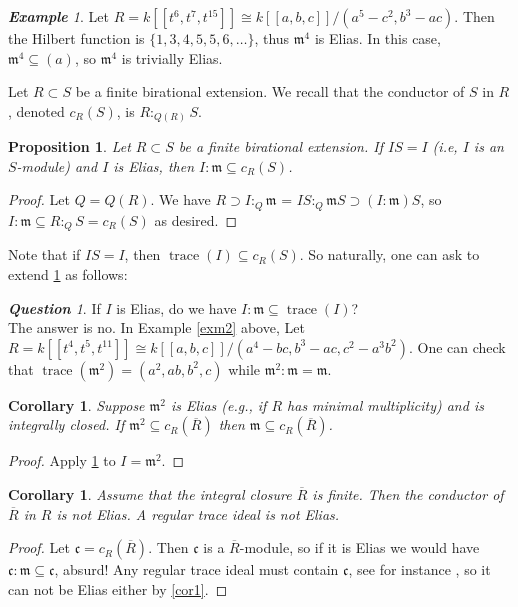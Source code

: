 \documentclass[a4paper,12pt]{amsart}
\newtheorem{prop}[thm]{\bf Proposition}
\newtheorem{cor}[thm]{\bf Corollary}
\theoremstyle{definition}
\theoremstyle{remark}
\newtheorem{question}[thm]{\bf Question}
\newtheorem{example}[thm]{\bf Example}
\numberwithin{equation}{section}
\DeclareMathOperator{\tr}{{trace}}
\def\fm{\mathfrak{m}}
\begin{document}
\begin{example}
Let $R=k[[t^6,t^7,t^{15}]]\cong k[[a,b,c]]/(a^5-c^2, b^3-ac)$. Then the Hilbert function is $\{1,3,4,5,5,6,\dots\}$, thus $\fm^4$ is Elias. In this case, $\fm^4 \subseteq (a)$, so $\fm^4$ is trivially Elias.   \end{example}

Let $R\subset S$ be a finite birational extension. We recall that the conductor of $S$ in $R$, denoted $c_R(S)$, is $R:_{Q(R)}S$. 

\begin{prop}\label{prop_bir}
Let $R\subset S$ be a finite birational extension. If $IS=I$ (i.e, $I$ is an $S$-module) and $I$ is Elias, then $I:\fm\subseteq c_R(S)$. 
\end{prop}



\begin{proof}
Let $Q=Q(R)$. We have $R\supset I:_Q\fm$ = $IS:_Q \fm S \supset (I:\fm)S$, so $I:\fm\subseteq R:_QS =c_R(S)$ as desired.  
\end{proof}



Note that if $IS=I$, then $\tr(I)\subseteq c_R(S)$. So naturally, one can ask to extend \ref{prop_bir} as follows:

\begin{question}
If $I$ is Elias, do we have $I:\fm\subseteq \tr(I)$?\\

The answer is no. In Example \ref{exm2} above, Let $R=k[[t^4,t^5,t^{11}]]\cong k[[a,b,c]]/(a^4-bc, b^3-ac, c^2-a^3b^2)$. One can check that $\tr(\fm^2)=(a^2,ab,b^2,c)$ while $\fm^2:\fm=\fm$. 
\end{question}


\begin{cor}
Suppose $\fm^2$ is Elias (e.g., if $R$ has minimal multiplicity) and is integrally closed. If $\fm^2\subseteq c_R(\overline R)$  then $\fm\subseteq c_R(\overline R)$. 
\end{cor}

\begin{proof}
Apply \ref{prop_bir} to $I=\fm^2$. 
\end{proof}




\begin{cor}\label{cor_trace}
Assume that  the integral closure $\overline R$ is finite. Then the conductor  of $\overline R$ in $R$ is not Elias. A regular trace ideal is not Elias. 
\end{cor}
\begin{proof}
Let $\mathfrak{c} = c_R(\overline R)$. Then $\mathfrak{c}$ is a $\overline R$-module, so if it is Elias we would have $\mathfrak{c}:\fm\subseteq \mathfrak{c}$, absurd! Any regular trace ideal must contain $\mathfrak{c}$, see for instance \cite{dms}, so it can not be Elias either by \ref{cor1}. 
\end{proof}
\end{document}
